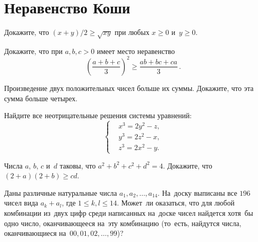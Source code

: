 
\section*{Неравенство Коши}


\begin{problems}

\item
Докажите, что $(x + y) / 2 \geq \sqrt{x y}$ при любых $x \geq 0$ и~$y \geq 0$.

\item
Докажите, что при $a, b, c > 0$ имеет место неравенство
\[
    \left(
        \frac{a + b + c}{3}
    \right)^2
\geq
    \frac{a b + b c + c a}{3}
\, . \]

\item
Произведение двух положительных чисел больше их суммы.
Докажите, что эта сумма больше четырех.

\item
Найдите все неотрицательные решения системы уравнений:
\[
\left\{\begin{aligned} &
    x^3 = 2 y^2 - z
, \\ &
    y^3 = 2 z^2 - x
, \\ &
    z^3 = 2 x^2 - y
. \end{aligned}\right.
\]

\item
Числа $a$, $b$, $c$ и~$d$ таковы, что $a^2 + b^2 + c^2 + d^2 = 4$.
Докажите, что $(2 + a) (2 + b) \geq c d$.

\item
Даны различные натуральные числа $a_{1}, a_{2}, \ldots, a_{14}$.
На~доску выписаны все $196$ чисел вида $a_{k} + a_{l}$, где
$1 \leq k, l \leq 14$.
Может~ли оказаться, что для любой комбинации из~двух цифр среди написанных
на~доске чисел найдется хотя~бы одно число, оканчивающееся на~эту комбинацию
(то~есть, найдутся числа, оканчивающиеся на~$00, 01, 02, \ldots, 99$)?

\end{problems}

